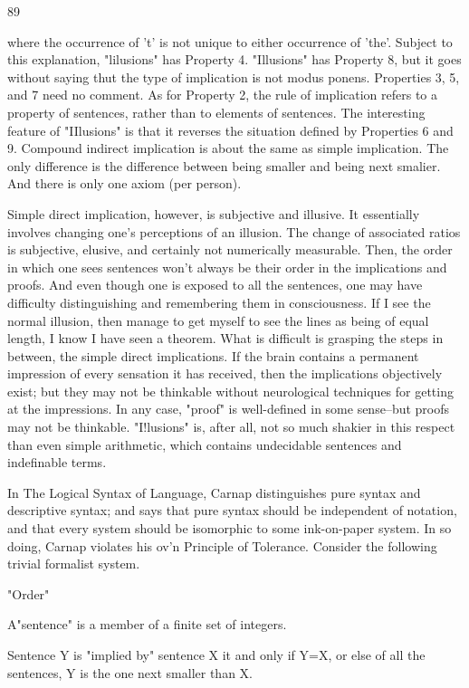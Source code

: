 \documentclass[10pt,twoside]{memoir}
\begin{document}
\begin{enumerate}
{{{{{{{{{{{{{{{{89 


where the occurrence of 't' is not unique to either occurrence of 'the'. 
Subject to this explanation, "lilusions" has Property 4. "Illusions" has 
Property 8, but it goes without saying thut the type of implication is not 
modus ponens. Properties 3, 5, and 7 need no comment. As for Property 2, 
the rule of implication refers to a property of sentences, rather than to 
elements of sentences. The interesting feature of "IIlusions" is that it 
reverses the situation defined by Properties 6 and 9. Compound indirect 
implication is about the same as simple implication. The only difference is 
the difference between being smaller and being next smalier. And there is 
only one axiom (per person). 

Simple direct implication, however, is subjective and illusive. It 
essentially involves changing one's perceptions of an illusion. The change of 
associated ratios is subjective, elusive, and certainly not numerically 
measurable. Then, the order in which one sees sentences won't always be 
their order in the implications and proofs. And even though one is exposed 
to all the sentences, one may have difficulty distinguishing and remembering 
them in consciousness. If I see the normal illusion, then manage to get 
myself to see the lines as being of equal length, I know I have seen a 
theorem. What is difficult is grasping the steps in between, the simple direct 
implications. If the brain contains a permanent impression of every sensation 
it has received, then the implications objectively exist; but they may not be 
thinkable without neurological techniques for getting at the impressions. In 
any case, "proof" is well-defined in some sense--but proofs may not be 
thinkable. "I!lusions" is, after all, not so much shakier in this respect than 
even simple arithmetic, which contains undecidable sentences and 
indefinable terms. 

In The Logical Syntax of Language, Carnap distinguishes pure syntax 
and descriptive syntax; and says that pure syntax should be independent of 
notation, and that every system should be isomorphic to some ink-on-paper 
system. In so doing, Carnap violates his ov'n Principle of Tolerance. Consider 
the following trivial formalist system. 


"Order" 


A"sentence" is a member of a finite set of integers. 

Sentence Y is "implied by" sentence X it and only if Y=X, or else of all the 
sentences, Y is the one next smaller than X. 

}}}}}}}}}}}}}}}}
\end{enumerate}
\end{document}
